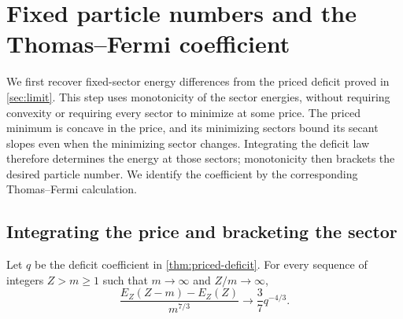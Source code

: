 \section{Fixed particle numbers and the Thomas--Fermi coefficient}
\label{sec:fixed-sectors}

We first recover fixed-sector energy differences from the priced deficit
proved in \cref{sec:limit}.  This step uses monotonicity of the sector
energies, without requiring convexity or requiring every sector to minimize
at some price.  The priced minimum is concave in the price, and its
minimizing sectors bound its secant slopes even when the minimizing sector
changes.  Integrating the deficit law therefore determines the energy at
those sectors; monotonicity then brackets the desired particle number.
We identify the coefficient by the corresponding Thomas--Fermi calculation.

\subsection{Integrating the price and bracketing the sector}

\begin{proposition}\label{prop:fixed-sector-limit}
Let $q$ be the deficit coefficient in \cref{thm:priced-deficit}.  For every
sequence of integers $Z>m\ge1$ such that $m\to\infty$ and $Z/m\to\infty$,
\begin{equation}\label{eq:fixed-sector-limit}
 \frac{E_Z(Z-m)-E_Z(Z)}{m^{7/3}}
       \longrightarrow\frac37q^{-4/3}.
\end{equation}
\end{proposition}

